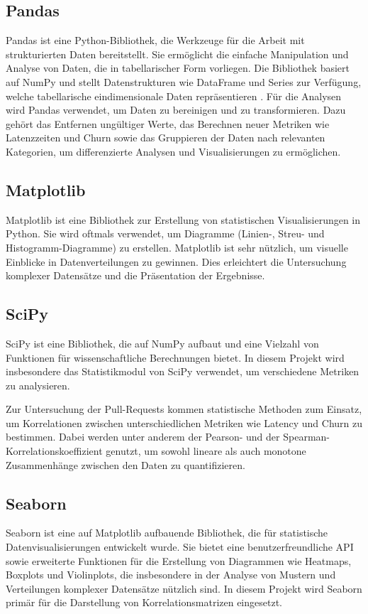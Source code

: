 \subsection{Pandas}
Pandas ist eine Python-Bibliothek, die Werkzeuge für die Arbeit mit strukturierten Daten bereitstellt. Sie ermöglicht die einfache Manipulation und Analyse von Daten, die in tabellarischer Form vorliegen. Die Bibliothek basiert auf NumPy und stellt Datenstrukturen wie DataFrame und Series zur Verfügung, welche tabellarische eindimensionale Daten repräsentieren  \parencite{noauthor_pandas_nodate}. Für die Analysen wird Pandas verwendet, um Daten zu bereinigen und zu transformieren. Dazu gehört das Entfernen ungültiger Werte, das Berechnen neuer Metriken wie Latenzzeiten und Churn sowie das Gruppieren der Daten nach relevanten Kategorien, um differenzierte Analysen und Visualisierungen zu ermöglichen.

\subsection{Matplotlib}
Matplotlib ist eine Bibliothek zur Erstellung von statistischen Visualisierungen in Python. Sie wird oftmals verwendet, um Diagramme (Linien-, Streu- und Histo\-gramm-Diagramme) zu erstellen. Matplotlib ist sehr nützlich, um visuelle Einblicke in Datenverteilungen zu gewinnen. Dies erleichtert die Untersuchung komplexer Datensätze und die Präsentation der Ergebnisse. \parencite{noauthor_matplotlib_nodate}

\subsection{SciPy}
SciPy ist eine Bibliothek, die auf NumPy aufbaut und eine Vielzahl von Funktionen für wissenschaftliche Berechnungen bietet. In diesem Projekt wird insbesondere das Statistikmodul von SciPy verwendet, um verschiedene Metriken zu analysieren.

Zur Untersuchung der Pull-Requests kommen statistische Methoden zum Einsatz, um Korrelationen zwischen unterschiedlichen Metriken wie Latency und Churn zu bestimmen. Dabei werden unter anderem der Pearson- und der Spearman-Korre\-lations\-koeffizient genutzt, um sowohl lineare als auch monotone Zusammenhänge zwischen den Daten zu quantifizieren. \parencite{noauthor_scipy_nodate}

\subsection{Seaborn}
Seaborn ist eine auf Matplotlib aufbauende Bibliothek, die für statistische Datenvisualisierungen entwickelt wurde. Sie bietet eine benutzerfreundliche API sowie erweiterte Funktionen für die Erstellung von Diagrammen wie Heatmaps, Boxplots und Violinplots, die insbesondere in der Analyse von Mustern und Verteilungen komplexer Datensätze nützlich sind.
In diesem Projekt wird Seaborn primär für die Darstellung von Korrelationsmatrizen eingesetzt. \parencite{waskom_seaborn_2021}


